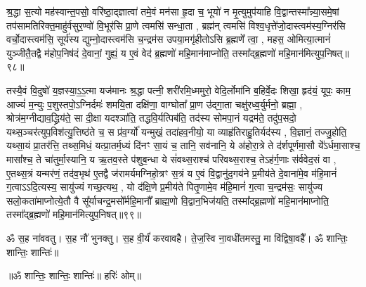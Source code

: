   श्र॒द्धा स॒त्यो मह॑स्वान्त॒पसो॒ वरि॑ष्ठा॒द्ज्ञात्वा॑ तमे॒वं मन॑सा हृ॒दा च॒ भूयो॑ न मृ॒त्युमुप॑याहि वि॒द्वान्तस्मा᳚न्न्या॒समे॒षां तप॑सामतिरिक्त॒माहु॑र्वसुर॒ण्वो॑ वि॒भूर॑सि प्रा॒णे त्वमसि॑ सन्धा॒ता \sep 
 ब्रह्म॑न् त्वमसि॑ विश्व॒धृत्ते॑जो॒दास्त्वम॑स्य॒ग्निर॑सि वर्चो॒दास्त्वम॑सि॒ सूर्य॑स्य द्युम्नो॒दास्त्वम॑सि च॒न्द्रम॑स उपया॒मगृ॑हीतोऽसि ब्र॒ह्मणे᳚ त्वा॒ \sep
 महस॒ ओमित्या॒त्मानं॑ युञ्जीतै॒तद्वै म॑होप॒निष॑दं दे॒वानां॒ गुह्यं॒ य ए॒वं वेद॑ ब्र॒ह्मणो॑ महि॒मान॑माप्नोति॒ तस्मा᳚द्ब्र॒ह्मणो॑ महि॒मान॑मित्युप॒निषत्॥९८॥\anuvakamend



तस्यै॒वं  वि॒दुषो॑ य॒ज्ञस्या॒ऽ॒ऽ॒त्मा यज॑मानः श्र॒द्धा पत्नी॒ शरी॑रमि॒ध्ममुरो॒ वेदि॒र्लोमा॑नि ब॒\ar{}हिर्वे॒दः शिखा॒ हृद॑यं॒ यूपः॒ काम॒ आज्यं॑ म॒न्युः प॒शुस्तपो॒ऽग्निर्दमः॑ शमयि॒ता दक्षि॑णा॒ वाग्घोता᳚ प्रा॒ण उ॑द्गा॒ता चक्षु॑रध्व॒र्युर्मनो॒ ब्रह्मा॒ \sep 
श्रोत्र॑म॒ग्नीद्याव॒द्ध्रिय॑ते॒ सा दी॒क्षा यदश्ञा॑ति॒ तद्धवि॒र्यत्पिब॑ति॒ तद॑स्य सोमपा॒नं यद्रम॑ते॒ तदु॑प॒सदो॒ यथ्स॒ञ्चर॑त्युप॒विश॑त्यु॒त्तिष्ठ॑ते च॒ स प्र॑व॒र्ग्यो॑ यन्मुखं॒ तदा॑हव॒नीयो॒ या व्याहृ॑तिराहु॒तिर्यद॑स्य \sep 
वि॒ज्ञानं॒ तज्जु॒होति॒ यथ्सा॒यं प्रा॒तर॑त्ति॒ तथ्स॒मिधं॒ यत्प्रा॒तर्म॒ध्यं दि॑नꣳ सा॒यं  च॒ तानि॒ सव॑नानि॒ ये अ॑होरा॒त्रे ते द॑र्\mbox{}शपूर्णमा॒सौ ये᳚ऽर्धमा॒साश्च॒ मासा᳚श्च॒ ते चा॑तुर्मा॒स्यानि॒ य ऋ॒तव॒स्ते प॑शुब॒न्धा ये सं॑वथ्स॒राश्च॑ परिवथ्स॒राश्च॒ तेऽह॑र्ग॒णाः स॑र्ववेद॒सं वा \sep 
ए॒तथ्स॒त्रं यन्मर॑णं॒ तद॑व॒भृथ॑ ए॒तद्वै ज॑रामर्यमग्निहो॒त्रꣳ स॒त्रं य ए॒वं  वि॒द्वानु॑द॒गय॑ने प्र॒मीय॑ते दे॒वाना॑मे॒व म॑हि॒मानं॑ ग॒त्वाऽऽदि॒त्यस्य॒ सायु॑ज्यं गच्छ॒त्यथ॒ \sep
यो द॑क्षि॒णे प्र॒मीय॑ते पितृ॒णामे॒व म॑हि॒मानं॑ ग॒त्वा च॒न्द्रम॑सः॒ सायु॑ज्य सलो॒कता॑माप्नोत्ये॒तौ वै सू᳚र्याचन्द्र॒मसो᳚र्महि॒मानौ᳚ ब्राह्म॒णो वि॒द्वान॒भिज॑यति॒ तस्मा᳚द्ब्र॒ह्मणो॑ महि॒मान॑माप्नोति॒ तस्मा᳚द्ब्र॒ह्मणो॑ महि॒मान॑मित्युप॒निषत्॥९९॥
\anuvakamend

ॐ स॒ह ना॑ववतु। 
स॒ह नौ॑ भुनक्तु। 
स॒ह वी॒र्यं॑ करवावहै। 
ते॒ज॒स्वि ना॒वधी॑तमस्तु॒ मा वि॑द्विषा॒वहै᳚। 
ॐ शान्तिः॒ शान्तिः॒ शान्तिः॑॥

\centerline{॥ॐ शान्तिः॒ शान्तिः॒ शान्तिः॑॥ 
हरिः॑ ओम्॥}

\closesection
\clearpage
